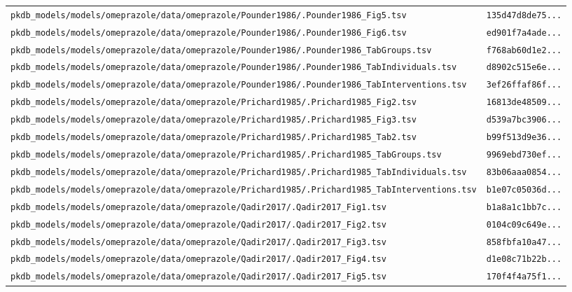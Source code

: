 \begin{longtable}{ll}
\texttt{pkdb\_models/models/omeprazole/data/omeprazole/Pounder1986/.Pounder1986\_Fig5.tsv} & \texttt{135d47d8de75...} \\
\texttt{pkdb\_models/models/omeprazole/data/omeprazole/Pounder1986/.Pounder1986\_Fig6.tsv} & \texttt{ed901f7a4ade...} \\
\texttt{pkdb\_models/models/omeprazole/data/omeprazole/Pounder1986/.Pounder1986\_TabGroups.tsv} & \texttt{f768ab60d1e2...} \\
\texttt{pkdb\_models/models/omeprazole/data/omeprazole/Pounder1986/.Pounder1986\_TabIndividuals.tsv} & \texttt{d8902c515e6e...} \\
\texttt{pkdb\_models/models/omeprazole/data/omeprazole/Pounder1986/.Pounder1986\_TabInterventions.tsv} & \texttt{3ef26ffaf86f...} \\
\texttt{pkdb\_models/models/omeprazole/data/omeprazole/Prichard1985/.Prichard1985\_Fig2.tsv} & \texttt{16813de48509...} \\
\texttt{pkdb\_models/models/omeprazole/data/omeprazole/Prichard1985/.Prichard1985\_Fig3.tsv} & \texttt{d539a7bc3906...} \\
\texttt{pkdb\_models/models/omeprazole/data/omeprazole/Prichard1985/.Prichard1985\_Tab2.tsv} & \texttt{b99f513d9e36...} \\
\texttt{pkdb\_models/models/omeprazole/data/omeprazole/Prichard1985/.Prichard1985\_TabGroups.tsv} & \texttt{9969ebd730ef...} \\
\texttt{pkdb\_models/models/omeprazole/data/omeprazole/Prichard1985/.Prichard1985\_TabIndividuals.tsv} & \texttt{83b06aaa0854...} \\
\texttt{pkdb\_models/models/omeprazole/data/omeprazole/Prichard1985/.Prichard1985\_TabInterventions.tsv} & \texttt{b1e07c05036d...} \\
\texttt{pkdb\_models/models/omeprazole/data/omeprazole/Qadir2017/.Qadir2017\_Fig1.tsv} & \texttt{b1a8a1c1bb7c...} \\
\texttt{pkdb\_models/models/omeprazole/data/omeprazole/Qadir2017/.Qadir2017\_Fig2.tsv} & \texttt{0104c09c649e...} \\
\texttt{pkdb\_models/models/omeprazole/data/omeprazole/Qadir2017/.Qadir2017\_Fig3.tsv} & \texttt{858fbfa10a47...} \\
\texttt{pkdb\_models/models/omeprazole/data/omeprazole/Qadir2017/.Qadir2017\_Fig4.tsv} & \texttt{d1e08c71b22b...} \\
\texttt{pkdb\_models/models/omeprazole/data/omeprazole/Qadir2017/.Qadir2017\_Fig5.tsv} & \texttt{170f4f4a75f1...} \\

\end{longtable}
